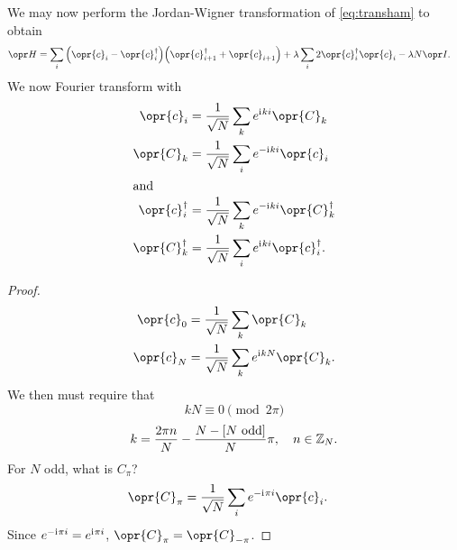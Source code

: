 \documentclass[../thesis.tex]{subfiles}
\begin{document}
We may now perform the Jordan-Wigner transformation of \cref{eq:transham} to
obtain
\begin{align}
  \ham
  &= \sum_i \qty(\opr{c}_i - \opr{c}_i^\dag) \qty(\opr{c}_{i+1}^\dag + \opr{c}_{i+1})
  + \lambda\sum_i 2\opr{c}_i^\dag\opr{c}_i
  - \lambda N \idopr.
  \label{eq:cham}
\end{align}
We now Fourier transform with
\begin{subequations}
\begin{align}
  \opr{c}_i
  &= \frac{1}{\sqrt{N}}\sum_k e^{\im ki} \opr{C}_k
  \label{eq:fourierc} \\
  \opr{C}_k
  &= \frac{1}{\sqrt{N}}\sum_i e^{-\im ki} \opr{c}_i
  \label{eq:fourierC} \\
  \shortintertext{and}
  \opr{c}_i^\dag
  &= \frac{1}{\sqrt{N}}\sum_k e^{-\im ki} \opr{C}_k^\dag
  \label{eq:fourierct} \\
  \opr{C}_k^\dag
  &= \frac{1}{\sqrt{N}}\sum_i e^{\im ki} \opr{c}_i^\dag
  \label{eq:fourierCt}.
\end{align}\label{eq:fourier}
\end{subequations}
\begin{proof}
  \begin{align}
    \opr{c}_0
    &= \frac{1}{\sqrt{N}}\sum_k \opr{C}_k \\
    \opr{c}_N
    &= \frac{1}{\sqrt{N}}\sum_k e^{\im kN} \opr{C}_k.
  \end{align}
  We then must require that
  \begin{equation}
    kN
    \equiv 0 \pmod{2\pi}
  \end{equation}
  \begin{equation}
    k
    = \frac{2\pi n}{N} - \frac{N - [\text{$N$ odd}]}{N}\pi \qc
    n \in \ZZ_N.
    \label{eq:fourierk}
  \end{equation}
  For $N$ odd, what is $C_{\pi}$?
  \begin{align}
    \opr{C}_{\pi}
    &= \frac{1}{\sqrt{N}} \sum_i e^{-\im \pi i} \opr{c}_i.
  \end{align}
  Since $e^{-\mathrm{i}\mkern1mu\pi i} = e^{\mathrm{i}\mkern1mu\pi i}$, $\opr{C}_\pi = \opr{C}_{-\pi}$.
\end{proof}
\end{document}
